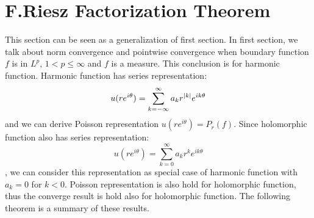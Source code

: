 % 
\section{F.Riesz Factorization Theorem}
This section can be seen as a generalization of first section. In first section, we talk about norm convergence and
pointwise convergence when boundary function $f$ is in $L^p$, $1< p\leq \infty$ and $f$ is a measure. This conclusion is for harmonic function.
Harmonic function has series representation:
\begin{equation*}
    u(re^{i\theta})=\sum_{k=-\infty}^\infty{a_kr^{\left\lvert k\right\rvert}e^{i k\theta}}
\end{equation*}
and we can derive Poisson representation $u(re^{i\theta})=P_r(f)$. Since holomorphic function also has series representation:
\begin{equation*}
    u(re^{i\theta})=\sum_{k=0}^\infty{a_kr^{k}e^{i k\theta}}
\end{equation*}
, we can consider this representation as special case of harmonic
function with $a_k=0$ for $k<0$. Poisson representation is also hold for holomorphic function, thus the converge result is
hold also for holomorphic function. The following theorem is a summary of these results.
